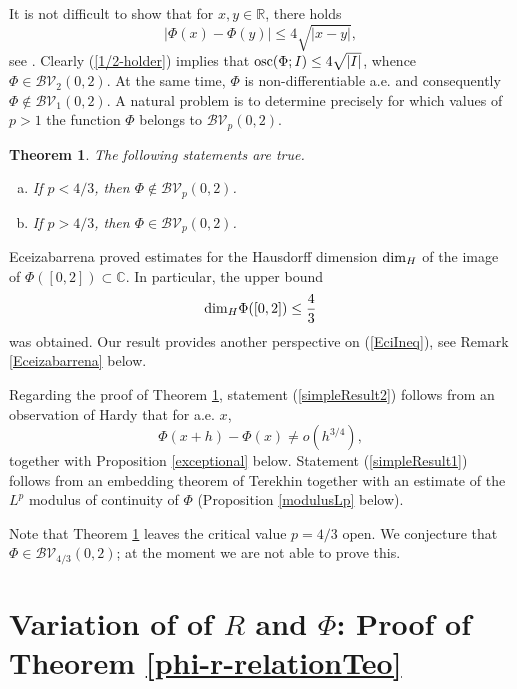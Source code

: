 \documentclass{amsart}
\newtheorem{theorem}{Theorem}[section]
\DeclareMathOperator{\osc}{{\rm osc}}
\numberwithin{equation}{section}
\begin{document}
It is not difficult to show that for $x,y\in\mathbb{R}$, there holds
\begin{equation}
    \label{1/2-holder}
    |\Phi(x)-\Phi(y)|\le 4\sqrt{|x-y|},
\end{equation}
see \cite[p. 316]{Du91}. Clearly (\ref{1/2-holder}) implies that $\osc(\Phi;I)\le 4\sqrt{|I|}$, whence $\Phi\in\mathcal{BV}_2(0,2)$. At the same time, $\Phi$ is non-differentiable a.e. and consequently $\Phi\notin\mathcal{BV}_1(0,2)$. A natural problem is to determine precisely for which values of $p>1$ the function $\Phi$ belongs to $\mathcal{BV}_p(0,2)$. 
\begin{theorem}
    \label{simpleResult}
    The following statements are true.
    \begin{enumerate}[(a)]
        \item\label{simpleResult2} If $p<4/3$, then $\Phi\notin\mathcal{BV}_p(0,2)$.
        \item\label{simpleResult1} If $p>4/3$, then $\Phi\in\mathcal{BV}_p(0,2)$.
    \end{enumerate}
\end{theorem}
Eceizabarrena \cite{Ec21} proved estimates for the Hausdorff dimension ${\rm dim}_H$ of the image of $\Phi([0,2])\subset\mathbb{C}$. In particular, the upper bound
\begin{equation}
    \label{EciIneq}
    {\rm dim}_H\Phi([0,2])\le\frac{4}{3}
\end{equation}
was obtained. Our result provides another perspective on (\ref{EciIneq}), see Remark \ref{Eceizabarrena} below. 

Regarding the proof of Theorem \ref{simpleResult}, statement (\ref{simpleResult2}) follows from an observation of Hardy \cite{Ha1916} that for a.e. $x$,
\begin{equation}
    \nonumber
    \Phi(x+h)-\Phi(x)\neq o(h^{3/4}),
\end{equation}
together with Proposition \ref{exceptional} below.
Statement (\ref{simpleResult1}) follows from an embedding theorem of Terekhin \cite{Te67} together with an estimate of the $L^p$ modulus of continuity of $\Phi$ (Proposition \ref{modulusLp} below). 


Note that Theorem \ref{simpleResult} leaves the critical value $p=4/3$ open.
We conjecture that $\Phi\in\mathcal{BV}_{4/3}(0,2)$; at the moment we are not able to prove this. 

\section{Variation of of $R$ and $\Phi$: Proof of Theorem \ref{phi-r-relationTeo}}
\end{document}
